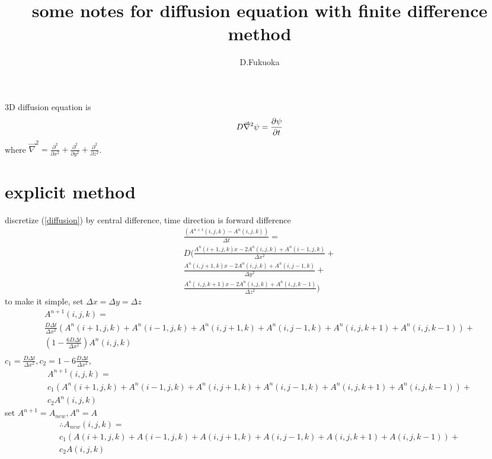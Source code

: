 \documentclass{article}
\title{some notes for diffusion equation with finite difference method}
\author{D.Fukuoka}
\begin{document}
\maketitle
3D diffusion equation is
\begin{equation}
  \label{diffusion}
  D\vec{\nabla}^2 \psi = \frac{\partial \psi}{\partial t} \\
\end{equation}
where $\vec{\nabla}^2 = \frac{\partial^2}{\partial x^2} + \frac{\partial^2}{\partial y^2} + \frac{\partial^2}{\partial z^2} \nonumber$.
\section{explicit method}
  discretize (\ref{diffusion}) by central difference, time direction is forward difference
\begin{multline}
  \frac{(A^{n+1}(i,j,k)-A^n(i,j,k))}{\Delta t} = \\
  D( \frac{A^n(i+1,j,k)x-2A^n(i,j,k)+A^n(i-1,j,k)}{\Delta x^2} + \\
  \frac{A^n(i,j+1,k)x-2A^n(i,j,k)+A^n(i,j-1,k)}{\Delta y^2} + \\
  \frac{A^n(\ i,j,k+1)x-2A^n(i,j,k)+A^n(i,j,k-1)}{\Delta z^2})
\end{multline}
to make it simple, set $\Delta x = \Delta y = \Delta z$
\begin{multline}
  A^{n+1}(i,j,k) = \\
  \frac{D\Delta t}{\Delta x^2}\left (A^n(i+1,j,k)+A^n(i-1,j,k)+A^n(i,j+1,k)+A^n(i,j-1,k)+A^n(i,j,k+1)+A^n(i,j,k-1)\right ) + \\
  \left ( 1-\frac{6D\Delta t}{\Delta x^2}\right )A^n(i,j,k) \\
\end{multline}
$c_1 = \frac{D\Delta t}{\Delta x^2}, c_2 = 1-6\frac{D\Delta t}{\Delta x^2}$,
\begin{multline}
  A^{n+1}(i,j,k) = \\
  c_1\left (A^n(i+1,j,k)+A^n(i-1,j,k)+A^n(i,j+1,k)+A^n(i,j-1,k)+A^n(i,j,k+1)+A^n(i,j,k-1)\right ) + \\
  c_2A^n(i,j,k)
\end{multline}
set $A^{n+1} = A_{new}, A^n = A$
\begin{multline}
  \therefore A_{new}(i,j,k) = \\
  c_1\left (A(i+1,j,k)+A(i-1,j,k)+A(i,j+1,k)+A(i,j-1,k)+A(i,j,k+1)+A(i,j,k-1)\right ) + \\
  c_2A(i,j,k)
\end{multline}
\end{document}
